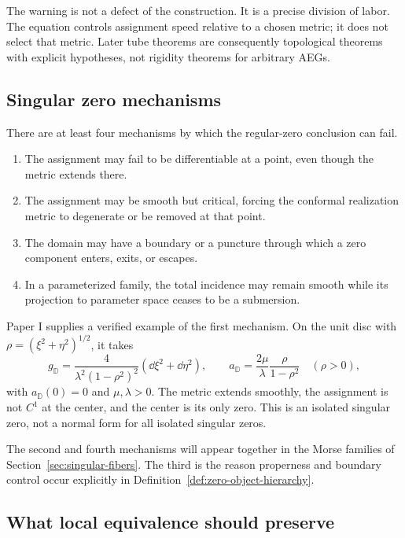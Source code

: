The warning is not a defect of the construction.  It is a precise division of
labor.  The equation controls assignment speed relative to a chosen metric; it
does not select that metric.  Later tube theorems are consequently topological
theorems with explicit hypotheses, not rigidity theorems for arbitrary AEGs.

\subsection{Singular zero mechanisms}

There are at least four mechanisms by which the regular-zero conclusion can fail.

\begin{enumerate}
\item The assignment may fail to be differentiable at a point, even though the
  metric extends there.
\item The assignment may be smooth but critical, forcing the conformal realization
  metric to degenerate or be removed at that point.
\item The domain may have a boundary or a puncture through which a zero component
  enters, exits, or escapes.
\item In a parameterized family, the total incidence may remain smooth while its
  projection to parameter space ceases to be a submersion.
\end{enumerate}

Paper I supplies a verified example of the first mechanism.  On the unit disc with
$\rho=(\xi^2+\eta^2)^{1/2}$, it takes
\begin{equation}
 g_{\mathbb D}=\frac{4}{\lambda^2(1-\rho^2)^2}
   (\dd\xi^2+\dd\eta^2),
 \qquad
 a_{\mathbb D}=\frac{2\mu}{\lambda}\frac{\rho}{1-\rho^2}
 \quad(\rho>0),
 \label{eq:imported-disc-model}
\end{equation}
with $a_{\mathbb D}(0)=0$ and $\mu,\lambda>0$.  The metric extends smoothly,
the assignment is not $C^1$ at the center, and the center is its only zero.  This
is an isolated singular zero, not a normal form for all isolated singular zeros.

The second and fourth mechanisms will appear together in the Morse families of
Section~\ref{sec:singular-fibers}.  The third is the reason properness and boundary
control occur explicitly in Definition~\ref{def:zero-object-hierarchy}.

\subsection{What local equivalence should preserve}

